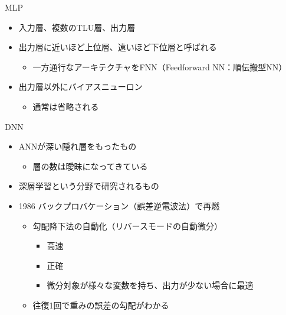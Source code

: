 \documentclass[aspectratio=169, dvipdfmx, 14pt, xcolor={svgnames,dvipsnames}]{beamer}
\def\tightlist{\itemsep1pt\parskip0pt\parsep0pt}
\begin{document}

\begin{frame}{\quad MLP}
  \begin{itemize}
    \tightlist
    \item
          入力層、複数のTLU層、出力層
    \item
          出力層に近いほど上位層、遠いほど下位層と呼ばれる

          \begin{itemize}
            \tightlist
            \item
                  一方通行なアーキテクチャをFNN（Feedforward NN：順伝搬型NN）
          \end{itemize}
    \item
          出力層以外にバイアスニューロン

          \begin{itemize}
            \tightlist
            \item
                  通常は省略される
          \end{itemize}
  \end{itemize}
\end{frame}


\begin{frame}{\quad DNN}
  \begin{itemize}
    \item
          ANNが深い隠れ層をもったもの

          \begin{itemize}
            \tightlist
            \item
                  層の数は曖昧になってきている
          \end{itemize}
    \item
          深層学習という分野で研究されるもの
    \item
          1986 \alert{バックプロバケーション（誤差逆電波法）}で再燃

          \begin{itemize}
            \tightlist
            \item
                  勾配降下法の自動化（リバースモードの自動微分）

                  \begin{itemize}
                    \tightlist
                    \item
                          高速
                    \item
                          正確
                    \item
                          微分対象が様々な変数を持ち、出力が少ない場合に最適
                  \end{itemize}
            \item
                  往復1回で重みの誤差の勾配がわかる
          \end{itemize}
  \end{itemize}
\end{frame}
\end{document}
